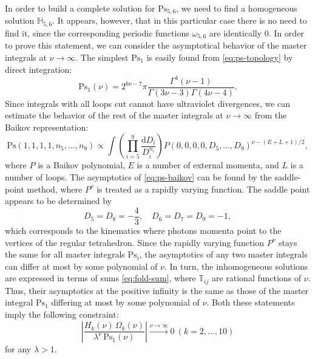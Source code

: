\documentclass[sort&compress]{elsarticle}
\begin{document}
In order to build a complete solution for $\mathrm{Ps}_{5,6}$, we need to find a homogeneous solution $\mathbb{H}_{5,6}$.
It appears, however, that in this particular case there is no need to find it, since the corresponding periodic functions $\omega_{5,6}$ are identically 0.
In order to prove this statement, we can consider the asymptotical behavior of the master integrals at $\nu\to\infty$.
The simplest $\mathrm{Ps}_1$ is easily found from \cref{eq:ps-topology} by direct integration:
\begin{equation}
	\label{eq:ps1-sol}
	\mathrm{Ps}_1(\nu) = 2^{6\nu-7} \pi \frac{\Gamma^4(\nu-1)}{\Gamma(3\nu-3) \Gamma(4\nu-4)}.
\end{equation}
Since integrals with all loops cut cannot have ultraviolet divergences,
we can estimate the behavior of the rest of the master integrals at $\nu\to\infty$ from the Baikov representation:
\begin{equation}
	\label{eq:ps-baikov}
	\mathrm{Ps}(1, 1, 1, 1, n_5, \ldots, n_9) \propto
		\int \left( \prod_{i=5}^{9} \frac{\mathrm{d} D_i}{D_i^{n_i}} \right) P(0, 0, 0, 0, D_5, \ldots, D_9)^{\nu - (E+L+1)/2},
\end{equation}
where $P$ is a Baikov polynomial, $E$ is a number of external momenta, and $L$ is a number of loops.
The asymptotics of \cref{eq:ps-baikov} can be found by the saddle-point method, where $P^\nu$ is treated as a rapidly varying function.
The saddle point appears to be determined by
\begin{equation}
	D_5 = D_8 = -\frac43, \quad D_6 = D_7 = D_9 = -1,
\end{equation}
which corresponds to the kinematics where photons momenta point to the vertices of the regular tetrahedron.
Since the rapidly varying function $P^\nu$ stays the same for all master integrals $\mathrm{Ps}_i$,
the asymptotics of any two master integrals can differ at most by some polynomial of $\nu$.
In turn, the inhomogeneous solutions are expressed in terms of sums \eqref{eq:fold-sum}, where $\mathbb{T}_{ij}$ are rational functions of $\nu$.
Thus, their asymptotics at the positive infinity is the same as those of the master integral $\mathrm{Ps}_1$ differing at most by some polynomial of $\nu$.
Both these statements imply the following constraint:
\begin{equation}
	\label{eq:omega-condition}
	\left|\frac{H_k(\nu) \, \Omega_k(\nu)}{\lambda^\nu \,\mathrm{Ps}_1(\nu)}\right| \overset{\nu\to\infty}{\longrightarrow} 0 \ (k=2,\ldots,10)
\end{equation}
for any $\lambda>1$.
\end{document}

